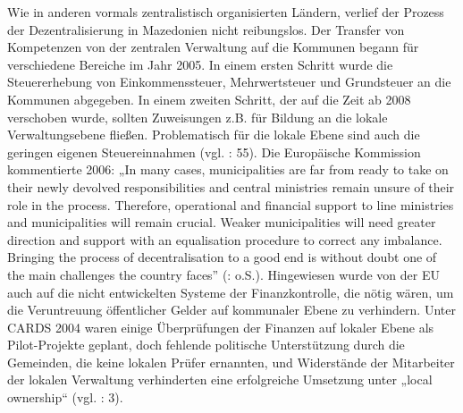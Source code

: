 Wie in anderen vormals zentralistisch organisierten Ländern, verlief der Prozess der Dezentralisierung in Mazedonien nicht reibungslos. Der Transfer von Kompetenzen von der zentralen Verwaltung auf die Kommunen begann für verschiedene Bereiche im Jahr 2005. In einem ersten Schritt wurde die Steuererhebung von Einkommenssteuer, Mehrwertsteuer und Grundsteuer an die Kommunen abgegeben. In einem zweiten Schritt, der auf die Zeit ab 2008 verschoben wurde, sollten Zuweisungen z.B. für Bildung an die lokale Verwaltungsebene fließen. Problematisch für die lokale Ebene sind auch die geringen eigenen Steuereinnahmen (vgl. \cite{repofmac12}: 55). Die Europäische Kommission kommentierte 2006: „In many cases, municipalities are far from ready to take on their newly devolved responsibilities and central ministries remain unsure of their role in the process. Therefore, operational and financial support to line ministries and municipalities will remain crucial. Weaker municipalities will need greater direction and support with an equalisation procedure to correct any imbalance. Bringing the process of decentralisation to a good end is without doubt one of the main challenges the country faces” (\cite{ear}: o.S.). Hingewiesen wurde von der EU auch auf die nicht entwickelten Systeme der Finanzkontrolle, die nötig wären, um die Veruntreuung öffentlicher Gelder auf kommunaler Ebene zu verhindern. Unter CARDS 2004 waren einige Überprüfungen der Finanzen auf lokaler Ebene als Pilot-Projekte geplant, doch fehlende politische Unterstützung durch die Gemeinden, die keine lokalen Prüfer ernannten, und Widerstände der Mitarbeiter der lokalen Verwaltung verhinderten eine erfolgreiche Umsetzung unter „local ownership“ (vgl. \cite{eurcom06a}: 3).

